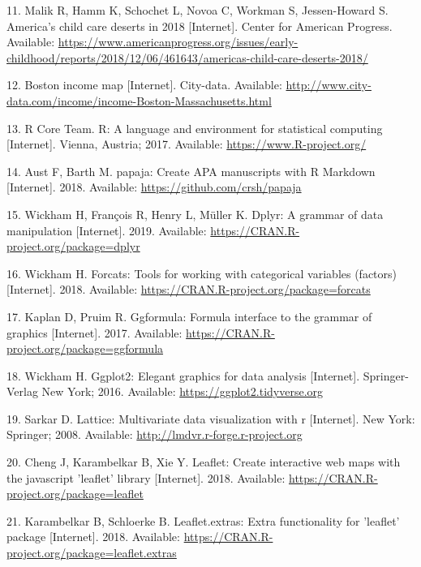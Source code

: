 \documentclass[10pt,letterpaper]{article}
\begin{document}
\hypertarget{ref-childcare_desert}{}
11. Malik R, Hamm K, Schochet L, Novoa C, Workman S, Jessen-Howard S.
America's child care deserts in 2018 {[}Internet{]}. Center for American
Progress. Available:
\url{https://www.americanprogress.org/issues/early-childhood/reports/2018/12/06/461643/americas-child-care-deserts-2018/}

\hypertarget{ref-bostonmap}{}
12. Boston income map {[}Internet{]}. City-data. Available:
\url{http://www.city-data.com/income/income-Boston-Massachusetts.html}

\hypertarget{ref-R-base}{}
13. R Core Team. R: A language and environment for statistical computing
{[}Internet{]}. Vienna, Austria; 2017. Available:
\url{https://www.R-project.org/}

\hypertarget{ref-R-papaja}{}
14. Aust F, Barth M. papaja: Create APA manuscripts with R Markdown
{[}Internet{]}. 2018. Available: \url{https://github.com/crsh/papaja}

\hypertarget{ref-R-dplyr}{}
15. Wickham H, François R, Henry L, Müller K. Dplyr: A grammar of data
manipulation {[}Internet{]}. 2019. Available:
\url{https://CRAN.R-project.org/package=dplyr}

\hypertarget{ref-R-forcats}{}
16. Wickham H. Forcats: Tools for working with categorical variables
(factors) {[}Internet{]}. 2018. Available:
\url{https://CRAN.R-project.org/package=forcats}

\hypertarget{ref-R-ggformula}{}
17. Kaplan D, Pruim R. Ggformula: Formula interface to the grammar of
graphics {[}Internet{]}. 2017. Available:
\url{https://CRAN.R-project.org/package=ggformula}

\hypertarget{ref-R-ggplot2}{}
18. Wickham H. Ggplot2: Elegant graphics for data analysis
{[}Internet{]}. Springer-Verlag New York; 2016. Available:
\url{https://ggplot2.tidyverse.org}

\hypertarget{ref-R-lattice}{}
19. Sarkar D. Lattice: Multivariate data visualization with r
{[}Internet{]}. New York: Springer; 2008. Available:
\url{http://lmdvr.r-forge.r-project.org}

\hypertarget{ref-R-leaflet}{}
20. Cheng J, Karambelkar B, Xie Y. Leaflet: Create interactive web maps
with the javascript 'leaflet' library {[}Internet{]}. 2018. Available:
\url{https://CRAN.R-project.org/package=leaflet}

\hypertarget{ref-R-leaflet.extras}{}
21. Karambelkar B, Schloerke B. Leaflet.extras: Extra functionality for
'leaflet' package {[}Internet{]}. 2018. Available:
\url{https://CRAN.R-project.org/package=leaflet.extras}
\end{document}
